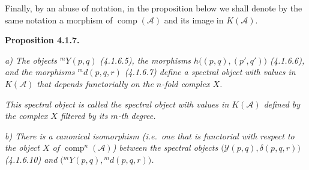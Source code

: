 Finally, by an abuse of notation, in the proposition below we shall denote
by the same notation a morphism of $\operatorname{comp}(\mathcal A)$ and
its image in $K(\mathcal A)$.

\medskip\noindent\textbf{Proposition 4.1.7.}\quad

\noindent\textit{a) The objects ${}^{m}\!Y(p,q)$ (4.1.6.5), the morphisms
$h\bigl((p,q),(p',q')\bigr)$ (4.1.6.6), and the morphisms
${}^{m}\!d(p,q,r)$ (4.1.6.7) define a spectral object with values in
$K(\mathcal A)$ that depends functorially on the $n$-fold complex $X$.}

\noindent\textit{This spectral object is called the spectral object with
values in $K(\mathcal A)$ defined by the complex $X$ filtered by its
$m$-th degree.}

\noindent\textit{b) There is a canonical isomorphism (i.e.\ one that is
functorial with respect to the object $X$ of
$\operatorname{comp}^n(\mathcal A)$) between the spectral objects
$\bigl(\mathcal Y(p,q),\delta(p,q,r)\bigr)$ (4.1.6.10) and
$\bigl({}^{m}\!Y(p,q),{}^{m}\!d(p,q,r)\bigr)$.}
\endgroup
